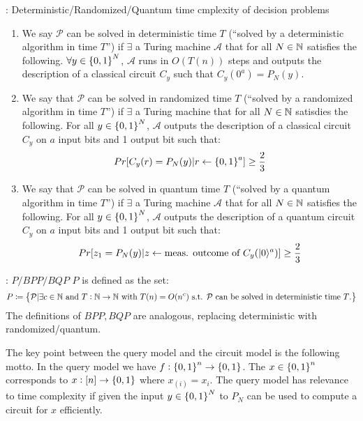 \begin{defbox}{: Deterministic/Randomized/Quantum time cmplexity of decision problems}
    \begin{enumerate}
        \item We say $\mathcal{P}$ can be solved in deterministic time $T$ (``solved by a deterministic algorithm in time $T$'') if $\exists$ a Turing machine $\mathcal{A}$ that for all $N \in \mathbb{N}$ satisfies the following. $\forall y \in \set{0, 1}^N$, $\mathcal{A}$ runs in $O(T(n))$ steps and outputs the description of a classical circuit $C_y$ such that $C_y(0^a) = P_N(y)$.
        \item We say that $\mathcal{P}$ can be solved in randomized time $T$ (``solved by a randomized algorithm in time $T$'') if $\exists$ a Turing machine that for all $N \in \mathbb{N}$ satisdies the following. For all $y \in \set{0, 1}^N$, $\mathcal{A}$ outputs the description of a classical circuit $C_y$ on $a$ input bits and 1 output bit such that:
        \begin{equation}
            Pr[C_y(r) = P_N(y) \vert r \leftarrow \set{0, 1}^a] \geq \frac{2}{3}
        \end{equation}
        \item We say that $\mathcal{P}$ can be solved in quantum time $T$ (``solved by a quantum algorithm in time $T$'') if $\exists$ a Turing machine $\mathcal{A}$ that for all $N \in \mathbb{N}$ satisfies the following. For all $y \in \set{0, 1}^N$, $\mathcal{A}$ outputs the description of a quantum circuit $C_y$ on $a$ input bits and 1 output bit such that:
        \begin{equation}
            Pr[z_1 = P_N(y) \vert z \leftarrow \text{meas. outcome of } C_y(\lvert 0 \rangle^a)] \geq \frac{2}{3}
        \end{equation}
    \end{enumerate}
\end{defbox}

\begin{defbox}{: $P/BPP/BQP$}
    $P$ is defined as the set:
    \begin{equation}
        P \coloneqq \set{\mathcal{P} \vert \exists c \in \mathbb{N}\text{ and } T: \mathbb{N}\to \mathbb{N}\text{ with } T(n) = O(n^c) \text{ s.t. $\mathcal{P}$ can be solved in deterministic time $T$.}}
    \end{equation}
    The definitions of $BPP, BQP$ are analogous, replacing deterministic with randomized/quantum.
\end{defbox}

The key point between the query model and the circuit model is the following motto. In the query model we have $f: \set{0, 1}^n \to \set{0, 1}$. The $x \in \set{0, 1}^n$ corresponds to $x:[n] \to \set{0, 1}$ where $x_(i) = x_i$. The query model has relevance to time complexity if given the input $y \in \set{0, 1}^N$ to $P_N$ can be used to compute a circuit for $x$ efficiently.

